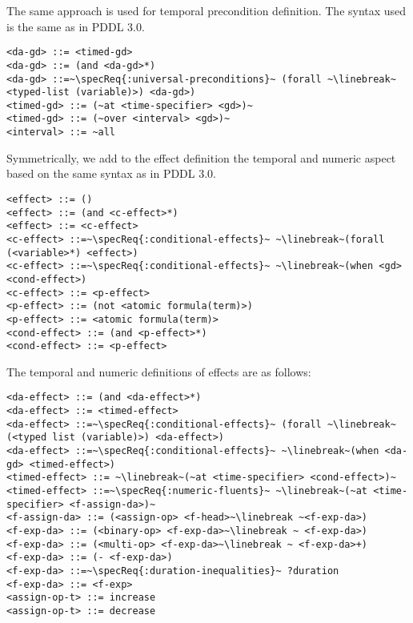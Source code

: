 \documentclass[letterpaper]{article} %
\begin{document}
%
%

\noindent The same approach is used for temporal precondition definition. The syntax used is the same as in PDDL 3.0.

\begin{lstlisting}[firstnumber=last, escapechar=~]
<da-gd> ::= <timed-gd>
<da-gd> ::= (and <da-gd>*)
<da-gd> ::=~\specReq{:universal-preconditions}~ (forall ~\linebreak~ <typed-list (variable)>) <da-gd>)
<timed-gd> ::= (~at <time-specifier> <gd>)~
<timed-gd> ::= (~over <interval> <gd>)~
<interval> ::= ~all
\end{lstlisting}

%
%
\noindent Symmetrically, we add to the effect definition the temporal and numeric aspect based on the same syntax as in PDDL 3.0.

\begin{lstlisting}[firstnumber=last, escapechar=~]
<effect> ::= ()
<effect> ::= (and <c-effect>*)
<effect> ::= <c-effect>
<c-effect> ::=~\specReq{:conditional-effects}~ ~\linebreak~(forall (<variable>*) <effect>)
<c-effect> ::=~\specReq{:conditional-effects}~ ~\linebreak~(when <gd> <cond-effect>)
<c-effect> ::= <p-effect>
<p-effect> ::= (not <atomic formula(term)>)
<p-effect> ::= <atomic formula(term)>
<cond-effect> ::= (and <p-effect>*)
<cond-effect> ::= <p-effect>
\end{lstlisting}

%
%

\noindent The temporal and numeric definitions of effects are as follows:

\begin{lstlisting}[firstnumber=last, escapechar=~]
<da-effect> ::= (and <da-effect>*)
<da-effect> ::= <timed-effect>
<da-effect> ::=~\specReq{:conditional-effects}~ (forall ~\linebreak~(<typed list (variable)>) <da-effect>)
<da-effect> ::=~\specReq{:conditional-effects}~ ~\linebreak~(when <da-gd> <timed-effect>)
<timed-effect> ::= ~\linebreak~(~at <time-specifier> <cond-effect>)~
<timed-effect> ::=~\specReq{:numeric-fluents}~ ~\linebreak~(~at <time-specifier> <f-assign-da>)~
<f-assign-da> ::= (<assign-op> <f-head>~\linebreak ~<f-exp-da>)
<f-exp-da> ::= (<binary-op> <f-exp-da>~\linebreak ~ <f-exp-da>)
<f-exp-da> ::= (<multi-op> <f-exp-da>~\linebreak ~ <f-exp-da>+)
<f-exp-da> ::= (- <f-exp-da>)
<f-exp-da> ::=~\specReq{:duration-inequalities}~ ?duration
<f-exp-da> ::= <f-exp>
<assign-op-t> ::= increase
<assign-op-t> ::= decrease
\end{lstlisting}
\end{document}
